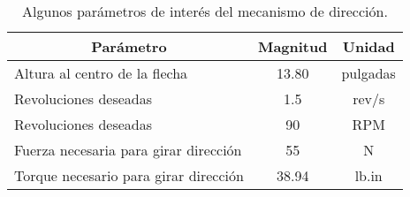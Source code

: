 \begin{table}[h]
\centering
\begin{tabular}{@{}lcc@{}}
\toprule
\multicolumn{1}{c}{\textbf{Parámetro}} & \textbf{Magnitud} & \textbf{Unidad} \\ \midrule
Altura al centro de la flecha          & 13.80             & pulgadas        \\
Revoluciones deseadas                  & 1.5               & rev/s           \\
Revoluciones deseadas                  & 90                & RPM             \\
Fuerza necesaria para girar dirección  & 55                & N               \\
Torque necesario para girar dirección  & 38.94             & lb.in           \\ \bottomrule
\end{tabular}
\caption{Algunos parámetros de interés del mecanismo de dirección.}
\label{tab:parametros_direccion}
\end{table}
